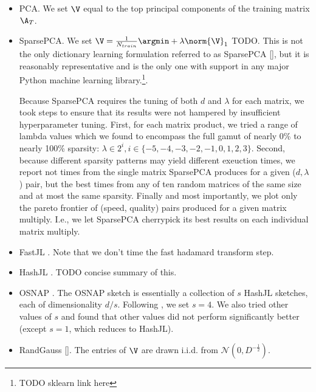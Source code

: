 \begin{itemize}\itemsep0em
    \item PCA. We set $\V$ equal to the top principal components of the training matrix $\A_T$.
    \item SparsePCA. We set $\V = \frac{1}{N_{train}} \argmin  + \lambda \norm{\V}_1$ TODO. This is not the only dictionary learning formulation referred to as SparsePCA [], but it is reasonably representative and is the only one with support in any major Python machine learning library.\footnote{TODO sklearn link here}.

    Because SparsePCA requires the tuning of both $d$ and $\lambda$ for each matrix, we took steps to ensure that its results were not hampered by insufficient hyperparameter tuning. First, for each matrix product, we tried a range of lambda values which we found to encompass the full gamut of nearly 0\% to nearly 100\% sparsity: $\lambda \in 2^i, i \in \{-5, -4, -3, -2, -1, 0, 1, 2, 3\}$. Second, because different sparsity patterns may yield different exeuction times, we report not times from the single matrix SparsePCA produces for a given ($d, \lambda$) pair, but the best times from any of ten random matrices of the same size and at most the same sparsity. Finally and most importantly, we plot only the pareto frontier of (speed, quality) pairs produced for a given matrix multiply. I.e., we let SparsePCA cherrypick its best results on each individual matrix multiply.
    \item FastJL \cite{fastjl}. Note that we don't time the fast hadamard transform step.
    \item HashJL \cite{hashjl}. TODO concise summary of this.
    \item OSNAP \cite{osnap}. The OSNAP sketch is essentially a collection of $s$ HashJL sketches, each of dimensionality $d / s$. Following \cite{iSVD}, we set $s = 4$. We also tried other values of $s$ and found that other values did not perform significantly better (except $s=1$, which reduces to HashJL).
    \item RandGauss []. The entries of $\V$ are drawn i.i.d. from $\mathcal{N}(0, D^{-\frac{1}{2}})$.

\end{itemize}

